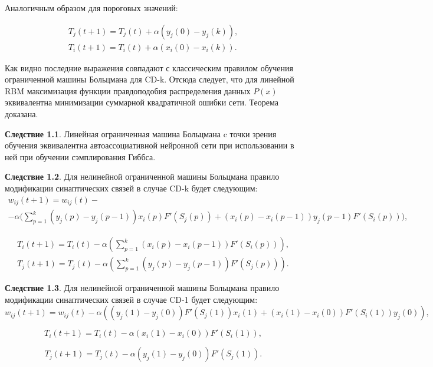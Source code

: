 Аналогичным образом для пороговых значений:

\begin{equation*}
\begin{aligned}
    T_{j}(t+1)=T_{j}(t)+\alpha(y_j(0)-y_j(k)),\\
    T_{i}(t+1)=T_{i}(t)+\alpha(x_i(0)-x_i(k)).
\end{aligned}
\end{equation*}

Как видно последние выражения совпадают с классическим правилом обучения ограниченной машины Больцмана для CD-k. Отсюда следует, что для линейной RBM максимизация функции правдоподобия распределения данных $P(x)$ эквивалентна минимизации суммарной квадратичной ошибки сети. Теорема доказана.

\textbf{Следствие 1.1}. Линейная ограниченная машина Больцмана c точки зрения обучения эквивалентна автоассоциативной нейронной сети при использовании в ней при обучении сэмплирования Гиббса.

\textbf{Следствие 1.2}. Для нелинейной ограниченной машины Больцмана правило модификации синаптических связей в случае CD-k будет следующим:
\begin{multline*}
    w_{ij}(t+1)=w_{ij}(t)-\\-\alpha\Bigg(\sum_{p=1}^k (y_j(p)-y_j(p-1))x_i(p)F'(S_j(p))+(x_i(p)-x_i(p-1))y_j(p-1)F'(S_i(p))\Bigg),
\end{multline*}

\begin{equation*}
\begin{aligned}
    T_i(t+1)=T_i(t)-\alpha\left(\sum_{p=1}^k (x_i(p)-x_i(p-1))F'(S_i(p))\right),\\
    T_j(t+1)=T_j(t)-\alpha\left(\sum_{p=1}^k (y_j(p)-y_j(p-1))F'(S_j(p))\right).
\end{aligned}
\end{equation*}

\textbf{Следствие 1.3}. Для нелинейной ограниченной машины Больцмана правило модификации синаптических связей в случае CD-1 будет следующим:	
\begin{equation*}
    w_{ij}(t+1)=w_{ij}(t)-\alpha((y_j(1)-y_j(0))F'(S_j(1))x_i(1)+(x_i(1)-x_i(0))F'(S_i(1))y_j(0)),
\end{equation*}

\begin{equation*}
    T_i(t+1)=T_i(t)-\alpha(x_i(1)-x_i(0))F'(S_i(1)),
\end{equation*}

\begin{equation*}
    T_j(t+1)=T_j(t)-\alpha(y_j(1)-y_j(0))F'(S_j(1)).  
\end{equation*}

